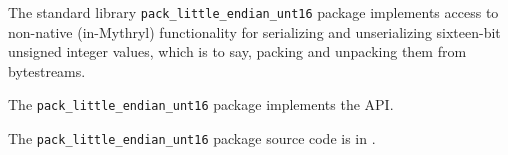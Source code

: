
The standard library {\tt pack\_little\_endian\_unt16} package implements access to 
non-native (in-Mythryl) functionality for 
serializing and unserializing sixteen-bit unsigned integer values, which is to say, 
packing and unpacking them from bytestreams.

The {\tt pack\_little\_endian\_unt16} package implements the 
 API.

The {\tt pack\_little\_endian\_unt16} package source code is in .



